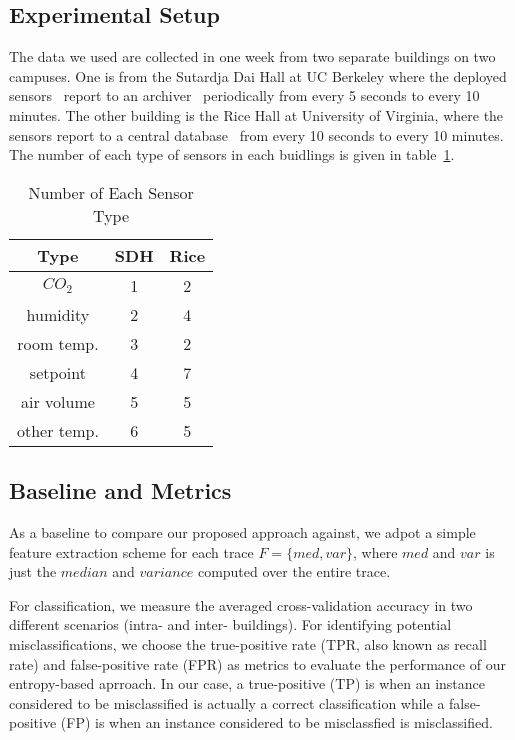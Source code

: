 \subsection{Experimental Setup}
The data we used are collected in one week from two separate buildings on two campuses. One is from the Sutardja Dai Hall at UC Berkeley where the deployed 
sensors~\cite{keti, bacnet} report to an archiver~\cite{smap} periodically from every 5 seconds to every 10 minutes. The other building is the Rice Hall at 
University of Virginia, where the sensors report to a central database~\cite{trane} from every 10 seconds to every 10 minutes. The number of each type of sensors in 
each buidlings is given in table~\ref{table:spec}.

\begin{table}[ht!]
\caption{Number of Each Sensor Type}
\centering %
\begin{tabular}{c c c}%
\hline %
Type & SDH & Rice \\ %
\hline\hline %
$CO_{2}$ & 1 & 2 \\ %
humidity & 2 & 4 \\
room temp. & 3 & 2 \\
setpoint & 4 & 7 \\
air volume & 5 & 5 \\ %
other temp. & 6 & 5 \\ %
\hline %
\end{tabular}
\label{table:spec} %
\end{table}

\subsection{Baseline and Metrics}
As a baseline to compare our proposed approach against, we adpot a simple feature extraction scheme for each trace $F=\{med, var\}$, where $med$ and $var$ is just the $median$ and $variance$ computed over the entire trace.

For classification, we measure the averaged cross-validation accuracy in two different scenarios (intra- and inter- buildings). For identifying potential 
misclassifications, we choose the true-positive rate (TPR, also known as recall rate) and false-positive rate (FPR) as metrics to evaluate the performance of 
our entropy-based aprroach. In our case, a true-positive (TP) is when an instance considered to be misclassified is actually a correct classification while a 
false-positive (FP) is when an instance considered to be misclassfied is misclassified.

